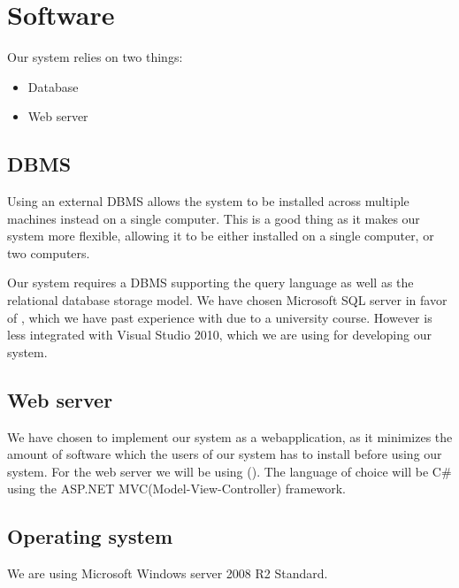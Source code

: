 \section{Software}
\label{sec:software}

Our system relies on two things:

\begin{itemize}
	\item Database
	\item Web server
\end{itemize}

\subsection{DBMS}
\label{subsec:dbms}

Using an external DBMS allows the system to be installed across multiple machines instead on a single computer. This is a good thing as it makes our system more flexible, allowing it to be either installed on a single computer, or two computers.

Our system requires a DBMS supporting the query language \sql[] as well as the relational database storage model.
We have chosen Microsoft SQL server in favor of \posgresql[], which we have past experience with due to a university course. However \posgresql[] is less integrated with Visual Studio 2010, which we are using for developing our system. 

\subsection{Web server}
\label{subsec:webserver}


We have chosen to implement our system as a webapplication, as it minimizes the amount of software which the users of our system has to install before using our system. 
For the web server we will be using  \wholeiis[] (\iis[]). 
The language of choice will be C\# using the ASP.NET MVC(Model-View-Controller) framework. \\


\subsection{Operating system}
\label{subsec:operating_system}

We are using Microsoft Windows server 2008 R2 Standard. 